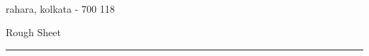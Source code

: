 \documentclass[10pt,a4paper]{article}
\title{\titlefont{Nirdesh 2024\vspace{-6.5ex}}}
\date{}
\begin{document}
\maketitle
\vspace{0.1mm}
\begin{center}
	\\
	rahara, kolkata - 700 118
\end{center}
\begin{center}
	Rough Sheet
\end{center}
\hrule
\end{document}
